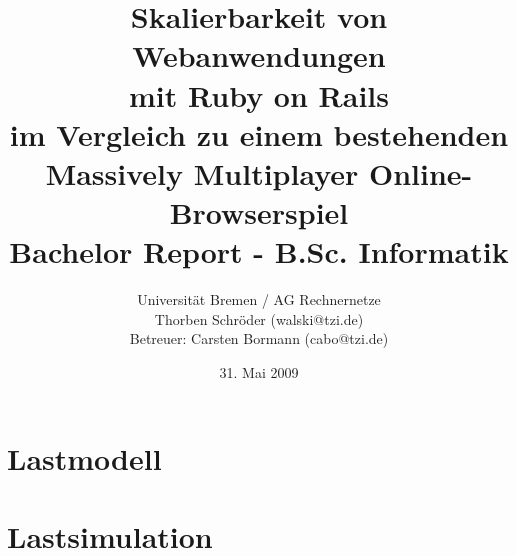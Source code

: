 \documentclass[1p]{scrartcl}
\title{Skalierbarkeit von Webanwendungen\\mit Ruby on Rails\\
\small{im Vergleich zu einem bestehenden\\Massively Multiplayer Online-Browserspiel}\\
\small{Bachelor Report - B.Sc. Informatik}\\
}
\author{Universität Bremen / AG Rechnernetze\\Thorben Schröder (walski@tzi.de)\\Betreuer: Carsten Bormann (cabo@tzi.de)}
\date{31. Mai 2009}
\begin{document}
\maketitle

\tableofcontents
\newpage

  \section{Lastmodell}
  \section{Lastsimulation}
    
\end{document}
